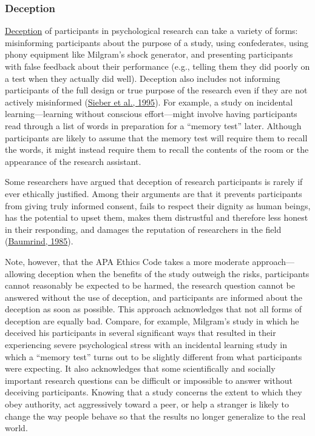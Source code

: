 \documentclass[
]{krantz}
\begin{document}
\hypertarget{deception}{%
\subsubsection*{Deception}\label{deception}}


\protect\hyperlink{deception-1}{Deception} of participants in psychological research can take a variety of forms: misinforming participants about the purpose of a study, using confederates, using phony equipment like Milgram's shock generator, and presenting participants with false feedback about their performance (e.g., telling them they did poorly on a test when they actually did well). Deception also includes not informing participants of the full design or true purpose of the research even if they are not actively misinformed (\protect\hyperlink{ref-sieber1995deception}{Sieber et al., 1995}). For example, a study on incidental learning---learning without conscious effort---might involve having participants read through a list of words in preparation for a ``memory test'' later. Although participants are likely to assume that the memory test will require them to recall the words, it might instead require them to recall the contents of the room or the appearance of the research assistant.

Some researchers have argued that deception of research participants is rarely if ever ethically justified. Among their arguments are that it prevents participants from giving truly informed consent, fails to respect their dignity as human beings, has the potential to upset them, makes them distrustful and therefore less honest in their responding, and damages the reputation of researchers in the field (\protect\hyperlink{ref-baumrind1985research}{Baumrind, 1985}).

Note, however, that the APA Ethics Code takes a more moderate approach---allowing deception when the benefits of the study outweigh the risks, participants cannot reasonably be expected to be harmed, the research question cannot be answered without the use of deception, and participants are informed about the deception as soon as possible. This approach acknowledges that not all forms of deception are equally bad. Compare, for example, Milgram's study in which he deceived his participants in several significant ways that resulted in their experiencing severe psychological stress with an incidental learning study in which a ``memory test'' turns out to be slightly different from what participants were expecting. It also acknowledges that some scientifically and socially important research questions can be difficult or impossible to answer without deceiving participants. Knowing that a study concerns the extent to which they obey authority, act aggressively toward a peer, or help a stranger is likely to change the way people behave so that the results no longer generalize to the real world.
\end{document}
